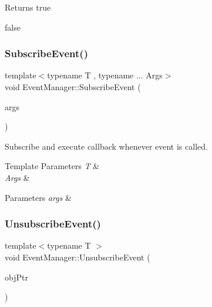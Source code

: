 \begin{DoxyReturn}{Returns}
true 

false 
\end{DoxyReturn}
\mbox{\label{classEventManager_a7db87bd554657a6259b31bfd6d099047}} 
\subsubsection{\texorpdfstring{Subscribe\+Event()}{SubscribeEvent()}}
{\footnotesize\ttfamily template$<$typename T , typename ... Args$>$ \\
void Event\+Manager\+::\+Subscribe\+Event (\begin{DoxyParamCaption}\item[{Args...}]{args }\end{DoxyParamCaption})}



Subscribe and execute callback whenever event is called. 


\begin{DoxyTemplParams}{Template Parameters}
{\em T} & \\
\hline
{\em Args} & \\
\hline
\end{DoxyTemplParams}

\begin{DoxyParams}{Parameters}
{\em args} & \\
\hline
\end{DoxyParams}
\mbox{\label{classEventManager_afd78cf90f852fe86e147954fc73c02ac}} 
\subsubsection{\texorpdfstring{Unsubscribe\+Event()}{UnsubscribeEvent()}}
{\footnotesize\ttfamily template$<$typename T $>$ \\
void Event\+Manager\+::\+Unsubscribe\+Event (\begin{DoxyParamCaption}\item[{void $\ast$}]{obj\+Ptr }\end{DoxyParamCaption})}



